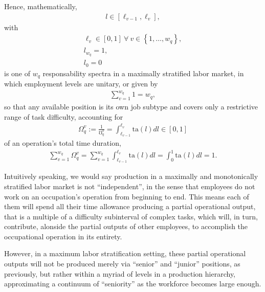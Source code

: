 \documentclass[hidelinks, nonatbib]{elsarticle}
\begin{document}
\begin{enumerate}
Hence, mathematically,
\begin{gather}
    l \in \left[
    \ell_{v-1}
    ,
    \ell_{v}
    \right]
    ,
\end{gather}
with
\begin{gather}
    \ell_{v} \in [0,1]
    \
    \forall
    \
    v \in 
    \left\{
        1, \dots, w_q
    \right\}
    ,
    \\
    l_{w_q} = 1
    ,
    \\
    l_0 = 0
\end{gather}
is one of $w_q$ responsability spectra in a maximally stratified labor market, in which employment levels are unitary, or given by
\begin{gather}
    \sum_{v=1}^{w_q}
    1
    =
    w_q
    ,
\end{gather}
so that any available position is its own job subtype and covers only a restrictive range of task difficulty, accounting for
\begin{gather}
    \Omega_{q}^{v} := 
    \frac{1}{\mho_{q}^{v}} = 
    \int_{
        \ell_{v-1}
    }^{
        \ell_{v}
    }
    \text{ta}(l)dl
    \in [0,1]
\end{gather}
of an operation's total time duration,
\begin{gather}
    \sum_{v=1}^{w_q}
    \Omega_{q}^{v} 
    = 
    \sum_{v=1}^{w_q}
    \int_{
        \ell_{v-1}
    }^{
        \ell_{v}
    }
    \text{ta}(l)dl
    =
    \int_{0}^{1}
    \text{ta}(l)dl
    =
    1
    .
\end{gather}

Intuitively speaking, we would say production in a maximally and monotonically stratified labor market is not ``independent'', in the sense that employees do not work on an occupation's operation from beginning to end. This means each of them will spend all their time allowance producing a partial operational output, that is a multiple of a difficulty subinterval of complex tasks, which will, in turn, contribute, alonside the partial outputs of other employees, to accomplish the occupational operation in its entirety.

However, in a maximum labor stratification setting, these partial operational outputs will not be produced merely via ``senior'' and ``junior'' positions, as previously, but rather within a myriad of levels in a production hierarchy, approximating a continuum of ``seniority'' as the workforce becomes large enough.


\end{enumerate}
\end{document}
